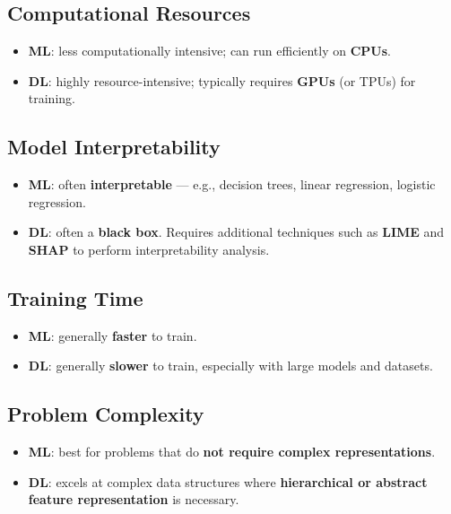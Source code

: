 \documentclass[11pt,a4paper]{article}
\theoremstyle{definition}
\theoremstyle{plain}
\theoremstyle{remark}
\begin{document}
\subsection{Computational Resources}

\begin{itemize}
    \item \textbf{ML}: less computationally intensive; can run efficiently on \textbf{CPUs}.
    \item \textbf{DL}: highly resource-intensive; typically requires \textbf{GPUs} (or TPUs) for training.
\end{itemize}

\subsection{Model Interpretability}

\begin{itemize}
    \item \textbf{ML}: often \textbf{interpretable} --- e.g., decision trees, linear regression, logistic regression.
    \item \textbf{DL}: often a \textbf{black box}. Requires additional techniques such as \textbf{LIME} and \textbf{SHAP} to perform interpretability analysis.
\end{itemize}

\subsection{Training Time}

\begin{itemize}
    \item \textbf{ML}: generally \textbf{faster} to train.
    \item \textbf{DL}: generally \textbf{slower} to train, especially with large models and datasets.
\end{itemize}

\subsection{Problem Complexity}

\begin{itemize}
    \item \textbf{ML}: best for problems that do \textbf{not require complex representations}.
    \item \textbf{DL}: excels at complex data structures where \textbf{hierarchical or abstract feature representation} is necessary.
\end{itemize}
\end{document}
